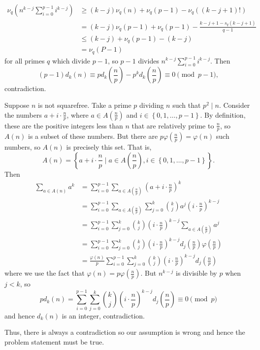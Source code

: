\begin{align*}
	\nu_q\left(n^{k-j}\displaystyle\sum_{i=0}^{p-1}i^{k-j}\right)&\geq\left(k-j\right)\nu_q\left(n\right)+\nu_q\left(p-1\right)-\nu_q\left(\left(k-j+1\right)!\right)\\
	&=\left(k-j\right)\nu_q\left(p-1\right)+\nu_q\left(p-1\right)-\frac{k-j+1-s_q\left(k-j+1\right)}{q-1}\\
	&\leq\left(k-j\right)+\nu_q\left(p-1\right)-\left(k-j\right)\\
	&=\nu_q\left(P-1\right)
\end{align*}
for all primes $q$ which divide $p-1$, so $p-1$ divides $n^{k-j}\displaystyle\sum_{i=0}^{p-1}i^{k-j}$. Then \[\left(p-1\right)d_k\left(n\right)\equiv pd_k\left(\frac{n}{p}\right)-p^kd_k\left(\frac{n}{p}\right)\equiv0\pmod{p-1},\] contradiction.

Suppose $n$ is not squarefree. Take a prime $p$ dividing $n$ such that $p^2\mid n$. Consider the numbers $a+i\cdot\frac{n}{p}$, where $a\in A\left(\frac{n}{p}\right)$ and $i\in\left\{0,1,\ldots,p-1\right\}$. By definition, these are the positive integers less than $n$ that are relatively prime to $\frac{n}{p}$, so $A\left(n\right)$ is a subset of these numbers. But there are $p\varphi\left(\frac{n}{p}\right)=\varphi\left(n\right)$ such numbers, so $A\left(n\right)$ is precisely this set. That is, \[A\left(n\right)=\left\{a+i\cdot\frac{n}{p}\mid a\in A\left(\frac{n}{p}\right),i\in\left\{0,1,\ldots,p-1\right\}\right\}.\] Then
\begin{align*}
	\displaystyle\sum_{a\in A\left(n\right)}a^k&=\displaystyle\sum_{i=0}^{p-1}\displaystyle\sum_{a\in A\left(\frac{n}{p}\right)}\left(a+i\cdot\frac{n}{p}\right)^k\\
	&=\displaystyle\sum_{i=0}^{p-1}\displaystyle\sum_{a\in A\left(\frac{n}{p}\right)}\displaystyle\sum_{j=0}^k\binom{k}{j}a^j\left(i\cdot\frac{n}{p}\right)^{k-j}\\
	&=\displaystyle\sum_{i=0}^{p-1}\displaystyle\sum_{j=0}^k\binom{k}{j}\left(i\cdot\frac{n}{p}\right)^{k-j}\displaystyle\sum_{a\in A\left(\frac{n}{p}\right)}a^j\\
	&=\displaystyle\sum_{i=0}^{p-1}\displaystyle\sum_{j=0}^k\binom{k}{j}\left(i\cdot\frac{n}{p}\right)^{k-j}d_j\left(\frac{n}{p}\right)\varphi\left(\frac{n}{p}\right)\\
	&=\frac{\varphi\left(n\right)}{p}\displaystyle\sum_{i=0}^{p-1}\displaystyle\sum_{j=0}^k\binom{k}{j}\left(i\cdot\frac{n}{p}\right)^{k-j}d_j\left(\frac{n}{p}\right)
\end{align*}
where we use the fact that $\varphi\left(n\right)=p\varphi\left(\frac{n}{p}\right)$. But $n^{k-j}$ is divisible by $p$ when $j<k$, so \[pd_k\left(n\right)=\displaystyle\sum_{i=0}^{p-1}\displaystyle\sum_{j=0}^k\binom{k}{j}\left(i\cdot\frac{n}{p}\right)^{k-j}d_j\left(\frac{n}{p}\right)\equiv0\pmod p\] and hence $d_k\left(n\right)$ is an integer, contradiction.

Thus, there is always a contradiction so our assumption is wrong and hence the problem statement must be true.